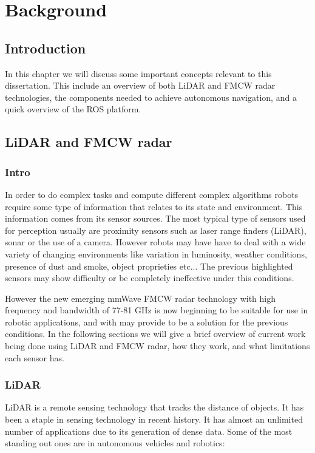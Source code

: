 \chapter{Background} \label{ch:Concepts}

\section{Introduction}
In this chapter we will discuss some important concepts relevant to this dissertation. This include an overview of both \ac{LiDAR} and \ac{FMCW} radar technologies, the components needed to achieve autonomous navigation,  and a quick overview of the \ac{ROS} platform.

\section{\ac{LiDAR} and \ac{FMCW} \ac{radar}}
\subsection{Intro}
In order to do complex tasks and compute different complex algorithms robots require some type of information that relates to its state and environment. This information comes from its sensor sources.
The most typical type of sensors used for perception usually are proximity sensors such as laser range finders (\ac{LiDAR}), sonar or the use of a camera. However robots may have have to deal with a wide variety of changing environments like variation in luminosity, weather conditions, presence of dust and smoke, object proprieties etc... The previous highlighted sensors may show difficulty or be completely ineffective under this conditions.

However the new emerging \ac{mmWave} \ac{FMCW} radar technology with high frequency and bandwidth of 77-81 GHz is now beginning to be suitable for use in robotic applications, and with may provide to be a solution for the previous conditions. In the following  sections we will give a brief overview of current work being done using \ac{LiDAR} and \ac{FMCW} \ac{radar}, how they work, and what limitations each sensor has.

\subsection{LiDAR}

\ac{LiDAR} is a remote sensing technology that tracks the distance of objects. It has been a staple in sensing technology in recent history. It has almost an  unlimited  number of applications \cite{lidar100uses} due to its generation of dense data. Some of the most standing out ones are in autonomous vehicles and robotics:
